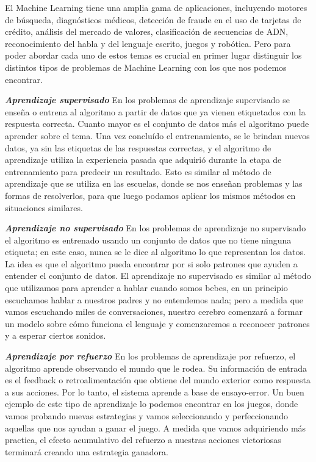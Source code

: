 El Machine Learning tiene una amplia gama de aplicaciones, incluyendo motores de búsqueda, diagnósticos médicos, detección de fraude en el uso de tarjetas de crédito, análisis del mercado de valores, clasificación de secuencias de ADN, reconocimiento del habla y del lenguaje escrito, juegos y robótica. Pero para poder abordar cada uno de estos temas es crucial en primer lugar distinguir los distintos tipos de problemas de Machine Learning con los que nos podemos encontrar.

\textbf{\textit{Aprendizaje supervisado}} En los problemas de aprendizaje supervisado se enseña o entrena al algoritmo a partir de datos que ya vienen etiquetados con la respuesta correcta. Cuanto mayor es el conjunto de datos más el algoritmo puede aprender sobre el tema. Una vez concluído el entrenamiento, se le brindan nuevos datos, ya sin las etiquetas de las respuestas correctas, y el algoritmo de aprendizaje utiliza la experiencia pasada que adquirió durante la etapa de entrenamiento para predecir un resultado. Esto es similar al método de aprendizaje que se utiliza en las escuelas, donde se nos enseñan problemas y las formas de resolverlos, para que luego podamos aplicar los mismos métodos en situaciones similares.

\textbf{\textit{Aprendizaje no supervisado}} En los problemas de aprendizaje no supervisado el algoritmo es entrenado usando un conjunto de datos que no tiene ninguna etiqueta; en este caso, nunca se le dice al algoritmo lo que representan los datos. La idea es que el algoritmo pueda encontrar por si solo patrones que ayuden a entender el conjunto de datos. El aprendizaje no supervisado es similar al método que utilizamos para aprender a hablar cuando somos bebes, en un principio escuchamos hablar a nuestros padres y no entendemos nada; pero a medida que vamos escuchando miles de conversaciones, nuestro cerebro comenzará a formar un modelo sobre cómo funciona el lenguaje y comenzaremos a reconocer patrones y a esperar ciertos sonidos.


\textbf{\textit{Aprendizaje por refuerzo}} En los problemas de aprendizaje por refuerzo, el algoritmo aprende observando el mundo que le rodea. Su información de entrada es el feedback o retroalimentación que obtiene del mundo exterior como respuesta a sus acciones. Por lo tanto, el sistema aprende a base de ensayo-error. Un buen ejemplo de este tipo de aprendizaje lo podemos encontrar en los juegos, donde vamos probando nuevas estrategias y vamos seleccionando y perfeccionando aquellas que nos ayudan a ganar el juego. A medida que vamos adquiriendo más practica, el efecto acumulativo del refuerzo a nuestras acciones victoriosas terminará creando una estrategia ganadora.


